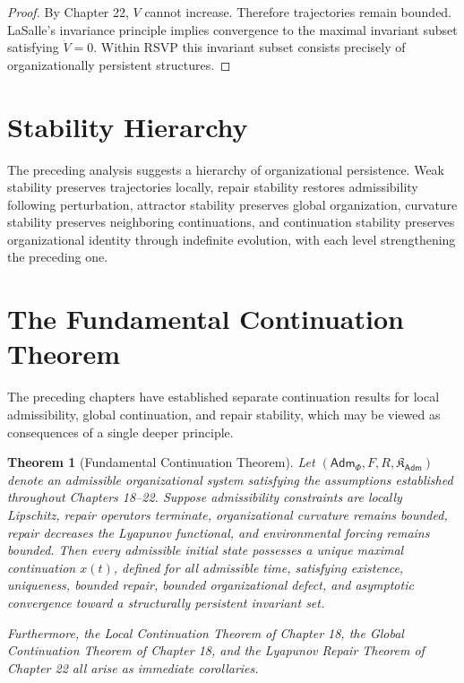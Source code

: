 \documentclass[11pt,oneside]{book}
\numberwithin{equation}{chapter}
\theoremstyle{definition}
\theoremstyle{plain}
\newtheorem{theorem}[definition]{Theorem}
\newcommand{\Adm}{\mathsf{Adm}}
\begin{document}
\begin{proof}
By Chapter 22, \(V\) cannot increase. Therefore trajectories remain bounded.
LaSalle's invariance principle implies convergence to the maximal invariant
subset satisfying \(\dot V=0\). Within RSVP this invariant subset consists
precisely of organizationally persistent structures.
\end{proof}

\section{Stability Hierarchy}

The preceding analysis suggests a hierarchy of organizational persistence. Weak stability preserves trajectories locally, repair stability restores admissibility following perturbation, attractor stability preserves global organization, curvature stability preserves neighboring continuations, and continuation stability preserves organizational identity through indefinite evolution, with each level strengthening the preceding one.

\section{The Fundamental Continuation Theorem}

The preceding chapters have established separate continuation results for local admissibility, global continuation, and repair stability, which may be viewed as consequences of a single deeper principle.

\begin{theorem}[Fundamental Continuation Theorem]
Let \((\Adm_\Phi,F,R,\mathfrak K_\Adm)\) denote an admissible organizational
system satisfying the assumptions established throughout Chapters 18--22.
Suppose admissibility constraints are locally Lipschitz, repair operators
terminate, organizational curvature remains bounded, repair decreases the
Lyapunov functional, and environmental forcing remains bounded. Then every
admissible initial state possesses a unique maximal continuation \(x(t)\),
defined for all admissible time, satisfying existence, uniqueness, bounded
repair, bounded organizational defect, and asymptotic convergence toward a
structurally persistent invariant set.

Furthermore, the Local Continuation Theorem of Chapter 18, the Global
Continuation Theorem of Chapter 18, and the Lyapunov Repair Theorem of
Chapter 22 all arise as immediate corollaries.
\end{theorem}
\end{document}
